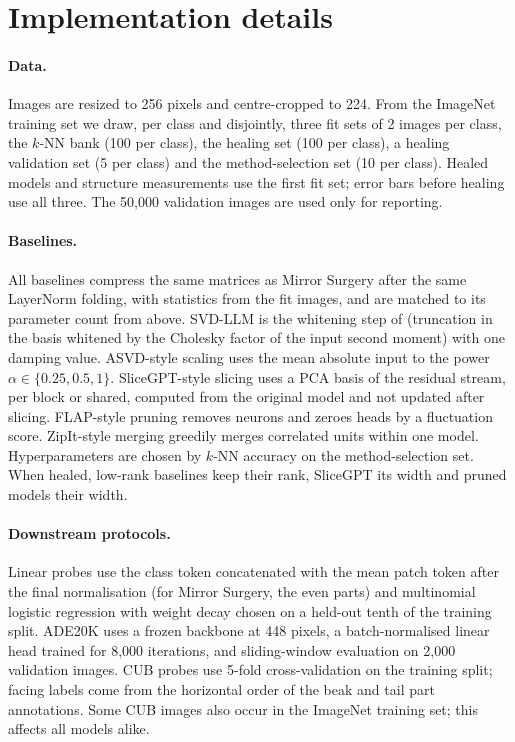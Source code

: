 \section{Implementation details}
\label{app:details}

\paragraph{Data.} Images are resized to 256 pixels and centre-cropped to 224. From the ImageNet training set we draw,
per class and disjointly, three fit sets of 2 images per class, the $k$-NN bank (100 per class), the healing set (100
per class), a healing validation set (5 per class) and the method-selection set (10 per class). Healed models and
structure measurements use the first fit set; error bars before healing use all three. The 50{,}000 validation images
are used only for reporting.

\paragraph{Baselines.} All baselines compress the same matrices as Mirror Surgery after the same LayerNorm folding,
with statistics from the fit images, and are matched to its parameter count from above. SVD-LLM is the whitening step
of \citet{wang2025svdllm} (truncation in the basis whitened by the Cholesky factor of the input second moment) with one
damping value. ASVD-style scaling uses the mean absolute input to the power $\alpha \in \{0.25, 0.5, 1\}$. SliceGPT-style
slicing uses a PCA basis of the residual stream, per block or shared, computed from the original model and not updated
after slicing. FLAP-style pruning removes neurons and zeroes heads by a fluctuation score. ZipIt-style merging greedily
merges correlated units within one model. Hyperparameters are chosen by $k$-NN accuracy on the method-selection set.
When healed, low-rank baselines keep their rank, SliceGPT its width and pruned models their width.

\paragraph{Downstream protocols.} Linear probes use the class token concatenated with the mean patch token after the
final normalisation (for Mirror Surgery, the even parts) and multinomial logistic regression with weight decay chosen
on a held-out tenth of the training split. ADE20K uses a frozen backbone at 448 pixels, a batch-normalised linear head
trained for 8{,}000 iterations, and sliding-window evaluation on 2{,}000 validation images. CUB probes use 5-fold
cross-validation on the training split; facing labels come from the horizontal order of the beak and tail part
annotations. Some CUB images also occur in the ImageNet training set; this affects all models alike.


